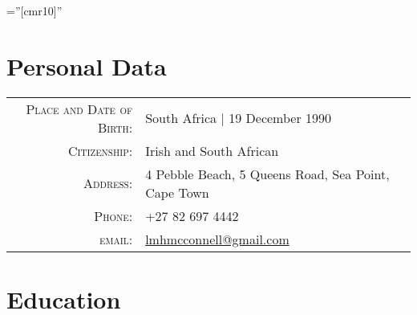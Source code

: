 \documentclass[a4paper,10pt]{article} %
\begin{document}
\pagestyle{empty} %

\font\fb=''[cmr10]'' %


\par{\bigskip\par} %

\section{Personal Data}

\begin{tabular}{rl}
\textsc{Place and Date of Birth:} & South Africa  | 19 December 1990 \\
\textsc{Citizenship:} & Irish and South African \\
\textsc{Address:} & 4 Pebble Beach, 5 Queens Road, Sea Point, Cape Town \\
\textsc{Phone:} & +27 82 697 4442\\
\textsc{email:} & \href{mailto:lmhmcconnell@gmail.com}{lmhmcconnell@gmail.com}
\end{tabular}


\section{Education}
\end{document}
